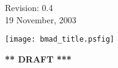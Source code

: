 \thispagestyle{empty}

\begin{flushright}
\large
  Revision: 0.4 \\
  19 November, 2003 \\
\end{flushright}

\vfill

{
\begin{center}
\texttt{[image: bmad\_title.psfig]} \\
\end{center}
}

\vskip 1in
\begin{center}
{\Huge \bf *** DRAFT ***}
\end{center}
\vfill
\break